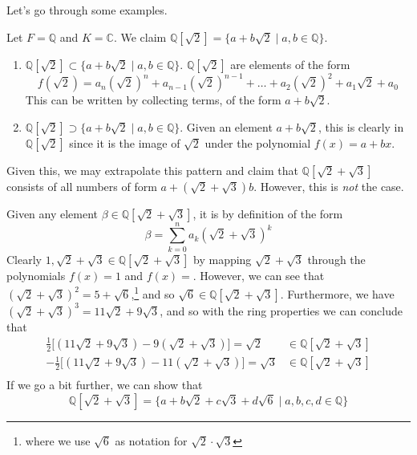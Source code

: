   Let's go through some examples. 

  \begin{example}
    Let $F = \mathbb{Q}$ and $K = \mathbb{C}$. We claim $\mathbb{Q}[\sqrt{2}] = \{a + b \sqrt{2} \mid a, b \in \mathbb{Q} \}$.
    \begin{enumerate}
      \item $\mathbb{Q}[\sqrt{2}] \subset \{a + b \sqrt{2} \mid a, b \in \mathbb{Q} \}$. $\mathbb{Q}[\sqrt{2}]$ are elements of the form
      \begin{equation}
        f(\sqrt{2}) = a_n (\sqrt{2})^n + a_{n-1} (\sqrt{2})^{n-1} + \ldots + a_2 (\sqrt{2})^2 + a_1 \sqrt{2} + a_0
      \end{equation} 
      This can be written by collecting terms, of the form $a + b \sqrt{2}$. 

      \item $\mathbb{Q}[\sqrt{2}] \supset \{a + b \sqrt{2} \mid a, b \in \mathbb{Q} \}$. Given an element $a + b \sqrt{2}$, this is clearly in $\mathbb{Q}[\sqrt{2}]$ since it is the image of $\sqrt{2}$ under the polynomial $f(x) = a + bx$. 
    \end{enumerate}
  \end{example} 

  Given this, we may extrapolate this pattern and claim that $\mathbb{Q}[\sqrt{2} + \sqrt{3}]$ consists of all numbers of form $a + (\sqrt{2} + \sqrt{3}) b$. However, this is \textit{not} the case. 

  \begin{example}
    Given any element $\beta \in \mathbb{Q}[\sqrt{2} + \sqrt{3}]$, it is by definition of the form 
    \begin{equation}
      \beta = \sum_{k=0}^n a_k (\sqrt{2} + \sqrt{3})^k 
    \end{equation} 
    Clearly $1, \sqrt{2} + \sqrt{3} \in \mathbb{Q}[\sqrt{2} + \sqrt{3}]$ by mapping $\sqrt{2} + \sqrt{3}$ through the polynomials $f(x) = 1$ and $f(x) = $. However, we can see that $(\sqrt{2} + \sqrt{3})^2 = 5 + \sqrt{6}$,\footnote{where we use $\sqrt{6}$ as notation for $\sqrt{2} \cdot \sqrt{3}$} and so $\sqrt{6} \in \mathbb{Q}[\sqrt{2} + \sqrt{3}]$. Furthermore, we have $(\sqrt{2} + \sqrt{3})^3 = 11 \sqrt{2} + 9 \sqrt{3}$, and so with the ring properties we can conclude that 
    \begin{align}
      \frac{1}{2} \big[ (11 \sqrt{2} + 9 \sqrt{3}) - 9 (\sqrt{2} + \sqrt{3})\big] = \sqrt{2} & \in \mathbb{Q}[\sqrt{2} + \sqrt{3}] \\
      -\frac{1}{2} \big[ (11 \sqrt{2} + 9 \sqrt{3}) - 11 (\sqrt{2} + \sqrt{3})\big] = \sqrt{3} & \in \mathbb{Q}[\sqrt{2} + \sqrt{3}] \\
    \end{align} 
    If we go a bit further, we can show that 
    \begin{equation}
      \mathbb{Q}[\sqrt{2} + \sqrt{3}] = \{a + b \sqrt{2} + c \sqrt{3} + d\sqrt{6} \mid a, b, c, d \in \mathbb{Q} \}
    \end{equation}
  \end{example}

